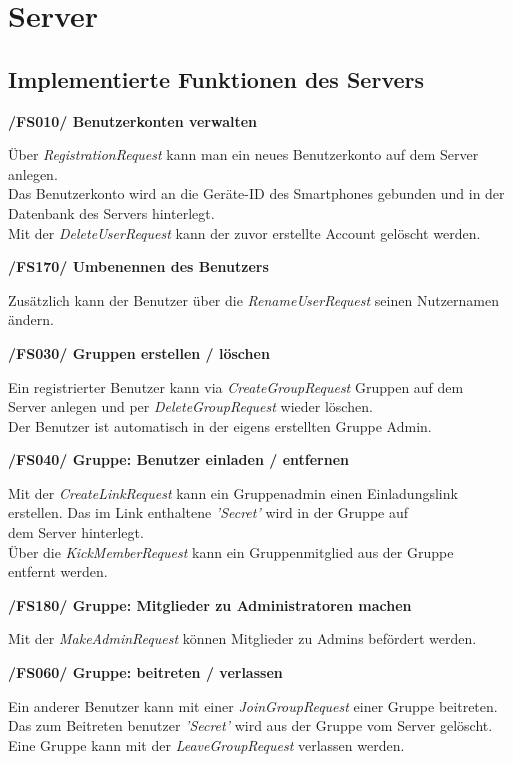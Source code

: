 \section{Server}

\subsection{Implementierte Funktionen des Servers}

\textbf{/FS010/ Benutzerkonten verwalten}

Über \textit{RegistrationRequest} kann man ein neues Benutzerkonto auf dem Server anlegen.\\
Das Benutzerkonto wird an die Geräte-ID des Smartphones gebunden und in der\\
Datenbank des Servers hinterlegt.\\
Mit der \textit{DeleteUserRequest} kann der zuvor erstellte Account gelöscht werden.

\textbf{/FS170/ Umbenennen des Benutzers}

Zusätzlich kann der Benutzer über die \textit{RenameUserRequest} seinen Nutzernamen ändern.

\textbf{/FS030/ Gruppen erstellen / löschen}

Ein registrierter Benutzer kann via \textit{CreateGroupRequest} Gruppen auf dem\\
Server anlegen und per \textit{DeleteGroupRequest} wieder löschen.\\
Der Benutzer ist automatisch in der eigens erstellten Gruppe Admin.

\textbf{/FS040/ Gruppe: Benutzer einladen / entfernen}

Mit der \textit{CreateLinkRequest} kann ein Gruppenadmin einen Einladungslink\\
erstellen. Das im Link enthaltene \textit{'Secret'} wird in der Gruppe auf\\
dem Server hinterlegt.\\
Über die \textit{KickMemberRequest} kann ein Gruppenmitglied aus der Gruppe\\
entfernt werden.

\textbf{/FS180/ Gruppe: Mitglieder zu Administratoren machen}

Mit der \textit{MakeAdminRequest} können Mitglieder zu Admins befördert werden.

\textbf{/FS060/ Gruppe: beitreten / verlassen}

Ein anderer Benutzer kann mit einer \textit{JoinGroupRequest} einer Gruppe beitreten.\\
Das zum Beitreten benutzer \textit{'Secret'} wird aus der Gruppe vom Server gelöscht.\\
Eine Gruppe kann mit der \textit{LeaveGroupRequest} verlassen werden.

